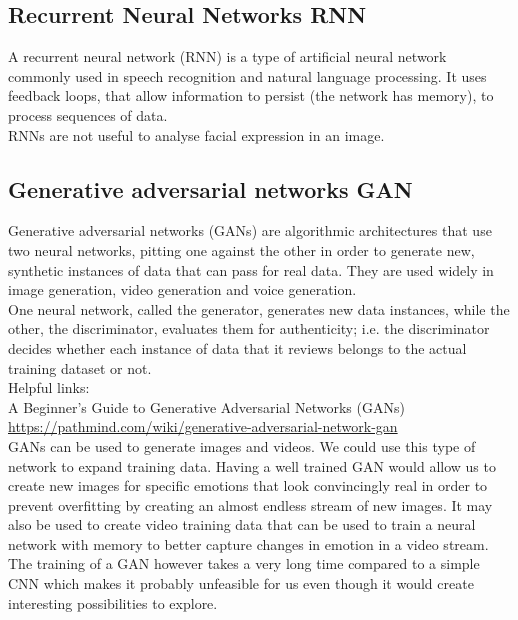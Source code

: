 \subsection{Recurrent Neural Networks RNN}

A recurrent neural network (RNN) is a type of artificial neural network commonly used in speech recognition and natural language processing. It uses feedback loops, that allow information to persist (the network has memory), to process sequences of data.\\

RNNs are not useful to analyse facial expression in an image.

\subsection{Generative adversarial networks GAN}

Generative adversarial networks (GANs) are algorithmic architectures that use two neural networks, pitting one against the other in order to generate new, synthetic instances of data that can pass for real data. They are used widely in image generation, video generation and voice generation.\\
One neural network, called the generator, generates new data instances, while the other, the discriminator, evaluates them for authenticity; i.e. the discriminator decides whether each instance of data that it reviews belongs to the actual training dataset or not.\\

Helpful links:\\
A Beginner's Guide to Generative Adversarial Networks (GANs)
\\
\url{https://pathmind.com/wiki/generative-adversarial-network-gan}
\\

GANs can be used to generate images and videos. We could use this type of network to expand training data. 
Having a well trained GAN would allow us to create new images for specific emotions that look convincingly real in order to prevent overfitting by creating an almost endless stream of new images. 
It may also be used to create video training data that can be used to train a neural network with memory to better capture changes in emotion in a video stream. 
The training of a GAN however takes a very long time compared to a simple CNN which makes it probably unfeasible for us even though it would create interesting possibilities to explore. 


